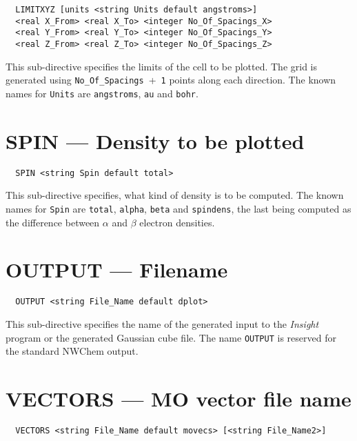 \begin{verbatim}
  LIMITXYZ [units <string Units default angstroms>]
  <real X_From> <real X_To> <integer No_Of_Spacings_X>
  <real Y_From> <real Y_To> <integer No_Of_Spacings_Y>
  <real Z_From> <real Z_To> <integer No_Of_Spacings_Z>
\end{verbatim}

This sub-directive specifies the limits of the cell to be plotted.
The grid is generated using \verb+No_Of_Spacings+~+~\verb+1+ points
along each direction. The known names for \verb+Units+ are
\verb+angstroms+, \verb+au+ and \verb+bohr+.



\section{SPIN --- Density to be plotted}

\begin{verbatim}
  SPIN <string Spin default total>
\end{verbatim}

This sub-directive specifies, what kind of density is to be computed. The 
known names for \verb+Spin+ are \verb+total+, \verb+alpha+, \verb+beta+
and \verb+spindens+, the last being computed as the difference between
$\alpha$ and $\beta$ electron densities.



\section{OUTPUT --- Filename}

\begin{verbatim}
  OUTPUT <string File_Name default dplot>
\end{verbatim}

This sub-directive specifies the name of the generated input to the
{\em Insight} program or the generated Gaussian cube file. 
The name \verb+OUTPUT+ is reserved for the
standard NWChem output.



\section{VECTORS --- MO vector file name}

\begin{verbatim}
  VECTORS <string File_Name default movecs> [<string File_Name2>]
\end{verbatim}

